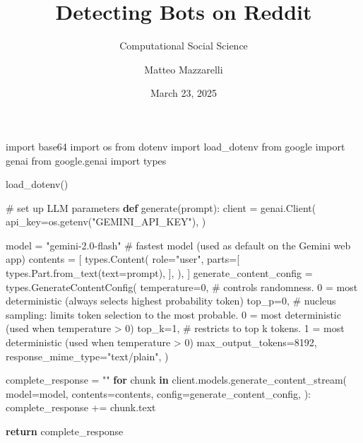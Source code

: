\documentclass[
  12pt,
  letterpaper,
  DIV=11,
  numbers=noendperiod]{scrartcl}
\title{Detecting Bots on Reddit}
\subtitle{Computational Social Science}
\author{Matteo Mazzarelli}
\date{March 23, 2025}
\newenvironment{Shaded}{\begin{snugshade}}{\end{snugshade}}
\newcommand{\CommentTok}[1]{\textcolor[rgb]{0.37,0.37,0.37}{#1}}
\newcommand{\ControlFlowTok}[1]{\textcolor[rgb]{0.00,0.23,0.31}{\textbf{#1}}}
\newcommand{\DecValTok}[1]{\textcolor[rgb]{0.68,0.00,0.00}{#1}}
\newcommand{\ImportTok}[1]{\textcolor[rgb]{0.00,0.46,0.62}{#1}}
\newcommand{\KeywordTok}[1]{\textcolor[rgb]{0.00,0.23,0.31}{\textbf{#1}}}
\newcommand{\NormalTok}[1]{\textcolor[rgb]{0.00,0.23,0.31}{#1}}
\newcommand{\OperatorTok}[1]{\textcolor[rgb]{0.37,0.37,0.37}{#1}}
\newcommand{\StringTok}[1]{\textcolor[rgb]{0.13,0.47,0.30}{#1}}
\begin{document}
\maketitle


\begin{Shaded}
\begin{Highlighting}[]
\ImportTok{import}\NormalTok{ base64}
\ImportTok{import}\NormalTok{ os}
\ImportTok{from}\NormalTok{ dotenv }\ImportTok{import}\NormalTok{ load\_dotenv }
\ImportTok{from}\NormalTok{ google }\ImportTok{import}\NormalTok{ genai}
\ImportTok{from}\NormalTok{ google.genai }\ImportTok{import}\NormalTok{ types}

\NormalTok{load\_dotenv()}

\CommentTok{\# set up LLM parameters}
\KeywordTok{def}\NormalTok{ generate(prompt):}
\NormalTok{    client }\OperatorTok{=}\NormalTok{ genai.Client(}
\NormalTok{        api\_key}\OperatorTok{=}\NormalTok{os.getenv(}\StringTok{"GEMINI\_API\_KEY"}\NormalTok{),}
\NormalTok{    )}

\NormalTok{    model }\OperatorTok{=} \StringTok{"gemini{-}2.0{-}flash"} \CommentTok{\# fastest model (used as default on the Gemini web app)}
\NormalTok{    contents }\OperatorTok{=}\NormalTok{ [}
\NormalTok{        types.Content(}
\NormalTok{            role}\OperatorTok{=}\StringTok{"user"}\NormalTok{,}
\NormalTok{            parts}\OperatorTok{=}\NormalTok{[}
\NormalTok{                types.Part.from\_text(text}\OperatorTok{=}\NormalTok{prompt),}
\NormalTok{            ],}
\NormalTok{        ),}
\NormalTok{    ]}
\NormalTok{    generate\_content\_config }\OperatorTok{=}\NormalTok{ types.GenerateContentConfig(}
\NormalTok{        temperature}\OperatorTok{=}\DecValTok{0}\NormalTok{, }\CommentTok{\# controls randomness. 0 = most deterministic (always selects highest probability token)}
\NormalTok{        top\_p}\OperatorTok{=}\DecValTok{0}\NormalTok{, }\CommentTok{\# nucleus sampling: limits token selection to the most probable. 0 = most deterministic (used when temperature \textgreater{} 0)}
\NormalTok{        top\_k}\OperatorTok{=}\DecValTok{1}\NormalTok{, }\CommentTok{\# restricts to top \textquotesingle{}k\textquotesingle{} tokens. 1 = most deterministic (used when temperature \textgreater{} 0)}
\NormalTok{        max\_output\_tokens}\OperatorTok{=}\DecValTok{8192}\NormalTok{,}
\NormalTok{        response\_mime\_type}\OperatorTok{=}\StringTok{"text/plain"}\NormalTok{,}
\NormalTok{    )}

\NormalTok{    complete\_response }\OperatorTok{=} \StringTok{""}
    \ControlFlowTok{for}\NormalTok{ chunk }\KeywordTok{in}\NormalTok{ client.models.generate\_content\_stream(}
\NormalTok{        model}\OperatorTok{=}\NormalTok{model,}
\NormalTok{        contents}\OperatorTok{=}\NormalTok{contents,}
\NormalTok{        config}\OperatorTok{=}\NormalTok{generate\_content\_config,}
\NormalTok{    ):}
\NormalTok{        complete\_response }\OperatorTok{+=}\NormalTok{ chunk.text}

    \ControlFlowTok{return}\NormalTok{ complete\_response}
\end{Highlighting}
\end{Shaded}
\end{document}
